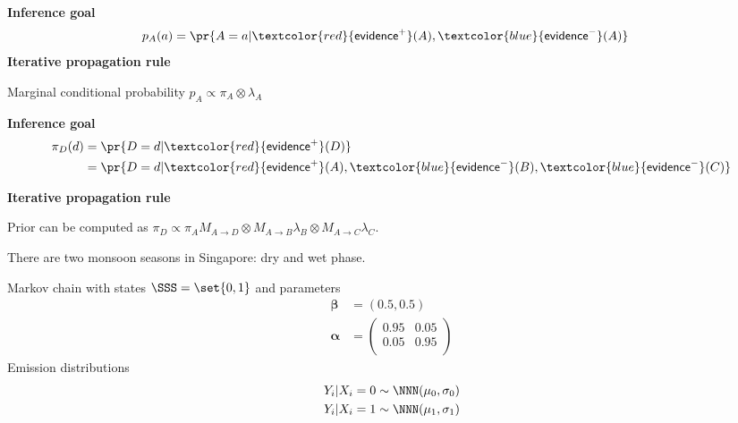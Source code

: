 \documentclass[landscape,footrule]{foils}
\renewcommand{\vec}[1]{\boldsymbol{#1}}
\newcommand{\EVPOS}{\textcolor{red}{\mathsf{evidence}^+}}
\newcommand{\EVNEG}{\textcolor{blue}{\mathsf{evidence}^-}}
\begin{document}
\textbf{Inference goal}
\begin{align*}
p_A(a)&=\pr{A=a|\EVPOS(A),\EVNEG(A)}
\end{align*}
\textbf{Iterative propagation rule}
\begin{triangles}
\item Marginal conditional probability $p_A\propto \pi_A\otimes\lambda_A$\vspace*{-1ex}
\end{triangles}


\enlargethispage{1cm}
\vspace*{-1.5cm}
\textbf{Inference goal}
\begin{align*}
\pi_D(d)&=\pr{D=d|\EVPOS(D)}\\
&=\pr{D=d|\EVPOS(A),\EVNEG(B),\EVNEG(C)}
\end{align*}\vspace*{-4ex}


\textbf{Iterative propagation rule}
\begin{triangles}
\item Prior can be computed as $\pi_D\propto \pi_AM_{A\to D} \otimes M_{A\to B}\lambda_B\otimes M_{A\to C}\lambda_C$\enspace.
\end{triangles}



There are two monsoon seasons in Singapore: dry and wet phase.

\enlargethispage{1cm}
Markov chain with states $\SSS=\set{0,1}$ and parameters
\begin{align*}
\vec{\beta}&=(0.5, 0.5)\\
\vec{\alpha}&=
\begin{pmatrix}
0.95 & 0.05\\
0.05 & 0.95\\
\end{pmatrix}
\end{align*}
Emission distributions
\begin{align*}
Y_i|X_i=0\sim\NNN(\mu_0,\sigma_0)\\
Y_i|X_i=1\sim\NNN(\mu_1,\sigma_1)\\
\end{align*}

\end{document}
